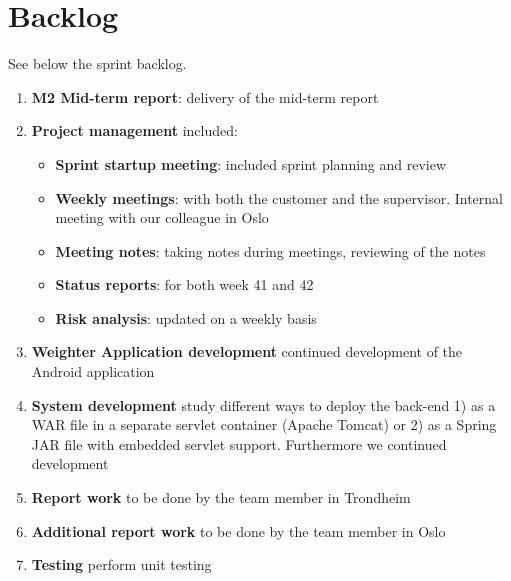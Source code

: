 \clearpage
\section{Backlog}
See below the sprint backlog.

\begin{enumerate}[1.]
\item \textbf{M2 Mid-term report}:
	delivery of the mid-term report
\item \textbf{Project management} included:
	\begin{itemize}
		\item \textbf{Sprint startup meeting}:
			included sprint planning and review
		\item \textbf{Weekly meetings}: 
			with both the customer and the supervisor. Internal meeting with our colleague in Oslo
		\item \textbf{Meeting notes}:
			taking notes during meetings, reviewing of the notes
		\item \textbf{Status reports}:
			for both week 41 and 42
		\item \textbf{Risk analysis}:
			updated on a weekly basis
	\end{itemize}
	\item \textbf{Weighter Application development}\newline
		continued development of the Android application
	\item \textbf{System development}\newline
		study different ways to deploy the back-end
		1) as a WAR file in a separate servlet container (Apache Tomcat) or 2) as a Spring JAR file
		with embedded servlet support. Furthermore we continued development
	\item \textbf{Report work}\newline
		to be done by the team member in Trondheim
	\item \textbf{Additional report work}\newline
		to be done by the team member in Oslo
	\item \textbf{Testing}\newline
		perform unit testing
\end{enumerate}
